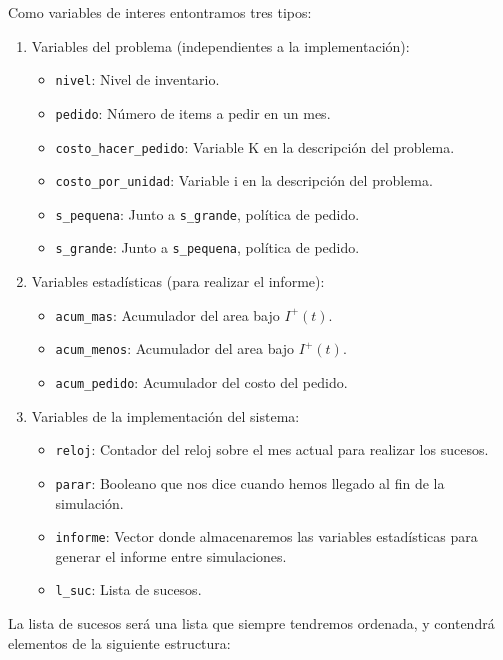 \documentclass[12pt, spanish]{article}
\begin{document}
Como variables de interes entontramos tres tipos:

\begin{enumerate}
	\item Variables del problema (independientes a la implementación):
		\begin{itemize}
			\item \texttt{nivel}: Nivel de inventario.
			\item \texttt{pedido}: Número de items a pedir en un mes.
			\item \texttt{costo\_hacer\_pedido}: Variable K en la descripción del problema.
			\item \texttt{costo\_por\_unidad}: Variable i en la descripción del problema.
			\item \texttt{s\_pequena}: Junto a \texttt{s\_grande}, política de pedido.
			\item \texttt{s\_grande}: Junto a \texttt{s\_pequena}, política de pedido.
		\end{itemize}

	\item Variables estadísticas (para realizar el informe):
		\begin{itemize}
			\item \texttt{acum\_mas}: Acumulador del area bajo $I^+(t)$.
			\item \texttt{acum\_menos}: Acumulador del area bajo $I^+(t)$.
			\item \texttt{acum\_pedido}: Acumulador del costo del pedido.
		\end{itemize}

	\item Variables de la implementación del sistema:
		\begin{itemize}
			\item \texttt{reloj}: Contador del reloj sobre el mes actual para realizar los sucesos.
			\item \texttt{parar}: Booleano que nos dice cuando hemos llegado al fin de la simulación.
			\item \texttt{informe}: Vector donde almacenaremos las variables estadísticas para generar el informe entre simulaciones.
			\item \texttt{l\_suc}: Lista de sucesos.
		\end{itemize}
\end{enumerate}

La lista de sucesos será una lista que siempre tendremos ordenada, y contendrá elementos de la siguiente estructura:
\end{document}
